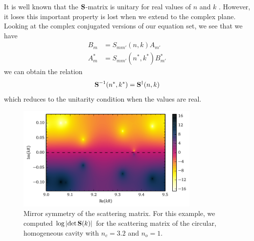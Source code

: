 It is well known that the $\mathbf{S}$-matrix is unitary 
for real values of $n$ and $k$ \cite{NEW1982}. However, 
it loses this important property is lost when we extend
to the complex plane. Looking at the complex conjugated versions
of our equation set, we see that we have
  \begin{align*}
    B_m		&= S_{mm'}(n,k)A_{m'}	\\
    A_m^*	&= S_{mm'}(n^*,k^*)B_{m'}^*
  \end{align*}
we can obtain the relation
  \begin{equation}
    \label{eq:passive.formalism.generalizedSmatrix}
    \mathbf{S}^{-1}(n^*,k^*) = \mathbf{S}^\dagger(n,k)
  \end{equation}
which reduces to the unitarity condition when 
the values are real. 

\begin{figure}
 \centering
 \includegraphics[width=0.8\textwidth]{figs/passive/determinantSmatrix.pdf}
 \caption[Mirror symmetry of the scattering matrix]
	 {Mirror symmetry of the scattering matrix. For this example, 
	 we computed $\log\left|\det\mathbf{S}(k)\right|$ for the scattering matrix of the
	 circular, homogeneous cavity with $n_c=3.2$ and $n_o=1$.}
  \label{fig:passive.formalism.symmetrySmatrix}
\end{figure}

